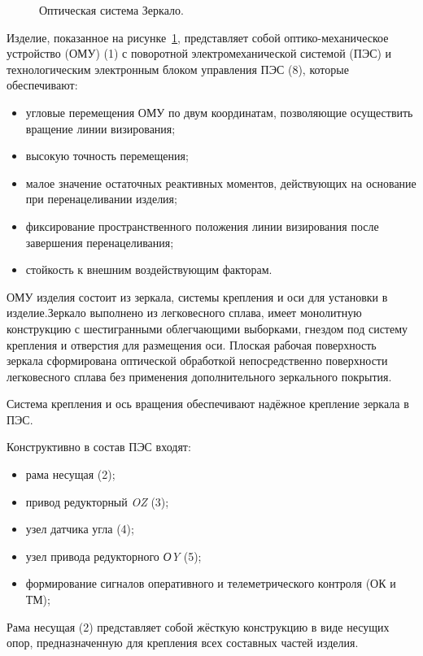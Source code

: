 \begin{figure}[ht] 
	\caption{Оптическая система Зеркало.}
	\label{fig:zerkalo} 
\end{figure}

Изделие, показанное на рисунке~\cref{fig:zerkalo}, представляет собой оптико-механическое устройство (ОМУ) (1) с поворотной электромеханической системой (ПЭС) и технологическим электронным блоком управления ПЭС (8), которые обеспечивают:
\begin{itemize}[beginpenalty=10000] %
	\item угловые перемещения ОМУ по двум координатам, позволяющие осуществить вращение линии визирования;
	\item высокую точность перемещения;
	\item малое значение остаточных реактивных моментов, действующих на основание при перенацеливании изделия;
	\item фиксирование пространственного положения линии визирования после завершения перенацеливания;
	\item стойкость к внешним воздействующим факторам.
\end{itemize}

ОМУ изделия состоит из зеркала, системы крепления и оси для установки в изделие.Зеркало выполнено из легковесного сплава, имеет монолитную конструкцию с шестигранными облегчающими выборками, гнездом под систему крепления и отверстия для размещения оси. Плоская рабочая поверхность зеркала сформирована оптической обработкой непосредственно поверхности легковесного сплава без применения дополнительного зеркального покрытия.

Система крепления и ось вращения обеспечивают надёжное крепление зеркала в ПЭС.

Конструктивно в состав ПЭС входят:
\begin{itemize}[beginpenalty=10000] %
	\item рама несущая (2);
	\item привод редукторный \textit{OZ} (3);
	\item узел датчика угла (4);
	\item узел привода редукторного \textit{ОY} (5);
	\item формирование сигналов оперативного и телеметрического контроля (ОК и ТМ);
\end{itemize}
Рама несущая (2) представляет собой жёсткую конструкцию в виде несущих опор, предназначенную для крепления всех составных частей изделия.

